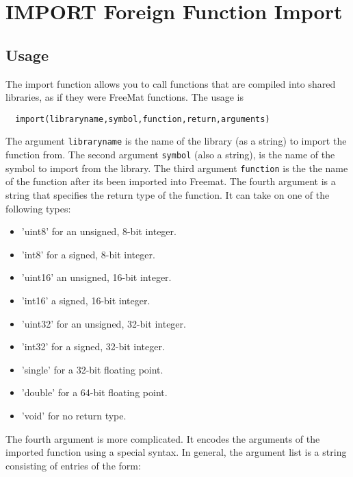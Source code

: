 \section{IMPORT Foreign Function Import}

\subsection{Usage}

The import function allows you to call functions that are compiled into
shared libraries, as if they were FreeMat functions. The usage is
\begin{verbatim}
  import(libraryname,symbol,function,return,arguments)
\end{verbatim}
The argument \verb|libraryname| is the name of the library (as a string)
to import the function from.  The second argument \verb|symbol| (also
a string), is the name of the symbol to import from the library.  The
third argument \verb|function| is the the name of the function after its
been imported into Freemat.  The fourth argument is a string that
specifies the return type of the function. It can take on one of the 
following types:
\begin{itemize}
\item  'uint8' for an unsigned, 8-bit integer.

\item  'int8' for a signed, 8-bit integer.

\item  'uint16' an unsigned, 16-bit  integer.

\item  'int16' a signed, 16-bit integer.

\item  'uint32' for an unsigned, 32-bit integer.

\item  'int32' for a signed, 32-bit integer.

\item  'single' for a 32-bit floating point.

\item  'double' for a 64-bit floating point.

\item  'void' for no return type.

\end{itemize}
The fourth argument is more complicated.  It encodes the arguments of the
imported function using a special syntax.  In general, the argument list
is a string consisting of entries of the form:

